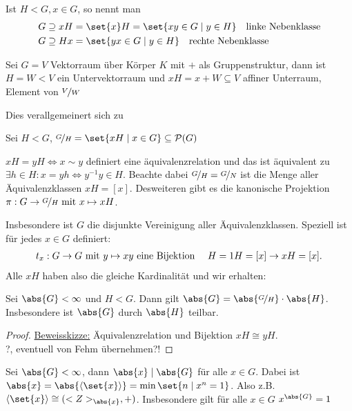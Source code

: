 \begin{definition}
	Ist $H < G, x \in G$, so nennt man
	\begin{align*}
	G \supseteq x H &= \set{x}H = \set{xy \in G \mid y \in H} \quad \text{linke Nebenklasse}\\
	G \supseteq H x &= \set{yx \in G \mid y \in H} \quad \text{rechte Nebenklasse}
	\end{align*}
\end{definition}
\begin{example}
	Sei $G = V$ Vektorraum über Körper $K$ mit $+$ als Gruppenstruktur, dann ist $H = W < V$ ein Untervektorraum und $xH = x + W \subseteq V$ affiner Unterraum, Element von $\lnkset{V}{W}$
\end{example}
Dies verallgemeinert sich zu
\begin{definition}
	Sei $H < G$, $\lnkset{G}{H} = \set{x H \mid x \in G} \subseteq \powerset(G)$
\end{definition}
\begin{remark}
	$xH = yH \Leftrightarrow x \sim y$ definiert eine äquivalenzrelation und das ist äquivalent zu $\exists h \in H: x = yh \Leftrightarrow y^{-1}y \in H$. Beachte dabei $\lnkset{G}{H} = \lnkset{G}{N}$ ist die Menge aller Äquivalenzklassen $xH = [x]$. Desweiteren gibt es die kanonische Projektion $\pi : G \to \lnkset{G}{H} \mit x \mapsto xH$.
\end{remark}
Insbesondere ist $G$ die disjunkte Vereinigung aller Äquivalenzklassen. Speziell ist für jedes $x \in G$ definiert:
\begin{align*}
	t_x : G \to G \mit y \mapsto xy \text{ eine Bijektion } \quad H = 1H = [x] \to xH = [x].
\end{align*}
Alle $xH$ haben also die gleiche Kardinalität und wir erhalten:
\begin{proposition}
	Sei $\abs{G} < \infty$ und $H < G$. Dann gilt $\abs{G} = \abs{\lnkset{G}{H}}\cdot \abs{H}$. Insbesondere ist $\abs{G}$ durch $\abs{H}$ teilbar.
\end{proposition}
\begin{proof}
	\ul{Beweisskizze:} Äquivalenzrelation und Bijektion $xH \cong yH$.\\
	?, eventuell von Fehm übernehmen?!
\end{proof}
\begin{conclusion}
	Sei $\abs{G} < \infty$, dann $\abs{x} \mid \abs{G}$ für alle $x \in G$. Dabei ist $\abs{x} = \abs{\langle \set{x}\rangle} = \min\set{n \mid x^n = 1}$. Also z.B. $\langle \set{x} \rangle \cong (\Z_{\abs{x}},+)$. Insbesondere gilt für alle $x \in G$ $x^{\abs{G}} = 1$
\end{conclusion}
